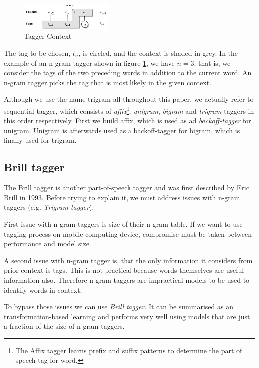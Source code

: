 \documentclass[10pt, conference, compsocconf]{IEEEtran}
\begin{document}
\begin{figure}[h]
\begin{center}
\includegraphics[width=0.4\textwidth]{tag-context.png} 
\end{center}
\caption{Tagger Context}
\label{fig:trigram}
\end{figure}

The tag to be chosen, $t_{n}$, is circled, and the context is shaded in grey.
In the example of an n-gram tagger shown in figure \ref{fig:trigram}, we have $n=3$; that is, we consider the tags of the two preceding words in addition to the current word.
An n-gram tagger picks the tag that is most likely in the given context.
\par
Although we use the name trigram all throughout this paper, we actually refer to sequential tagger, which consists of
\textit{affix}\footnote{The Affix tagger learns prefix and suffix patterns to determine the part of speech tag for word.}, \textit{unigram}, \textit{bigram} and \textit{trigram} taggers in this order respectively. First we build affix, which is used as ad \textit{backoff-tagger} for unigram. Unigram is afterwards used as a backoff-tagger for bigram, which is finally used for trigram.

\subsection{Brill tagger} %

The Brill tagger is another part-of-speech tagger and was first described by Eric Brill in 1993. Before trying to explain it, we must address issues with n-gram taggers (e.g. \textit{Trigram tagger}).

First issue with n-gram taggers is size of their n-gram table. If we want to use tagging process on mobile computing device, compromise must be taken between performance and model size. 

A second issue with n-gram tagger is, that the only information it considers from prior context is tags. This is not practical because words themselves are useful information also. Therefore n-gram taggers are impractical models to be used to identify words in context. 
  
To bypass those issues we can use \textit{Brill tagger}. It can be summarised as an transformation-based learning and performs very well using models that are just a fraction of the size of n-gram taggers.
\end{document}
